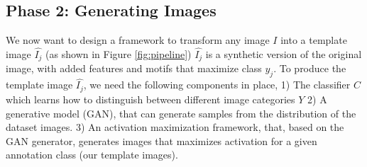 
\subsection{Phase 2: Generating Images}
\par 
We now want to design a framework to transform any image $I$ into a template image $\hat{I_j}$ (as shown in Figure \ref{fig:pipeline}) %
$\hat{I_j}$  is  a synthetic version of the original image, with added features and motifs that maximize class $y_j$. %
To produce the template image $\hat{I_j}$, we need the following components in place, 1) The classifier  $C$ which learns how to distinguish between different image categories $Y$ 2)  A generative model (GAN), that can generate samples from the distribution of the dataset images. 3) An activation maximization framework, that, based on the GAN generator, generates images that maximizes activation for a given annotation class \cite{dosovitskiy2016inverting} (our template images). 
